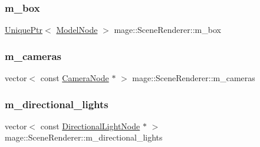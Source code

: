 \hypertarget{classmage_1_1_scene_renderer_a2083891540f5fca8a26ea8a10b7f01cc}{}\label{classmage_1_1_scene_renderer_a2083891540f5fca8a26ea8a10b7f01cc} 
\subsubsection{\texorpdfstring{m\+\_\+box}{m\_box}}
{\footnotesize\ttfamily \hyperlink{namespacemage_a3316d7143a973e37adf1110f2e80ca31}{Unique\+Ptr}$<$ \hyperlink{classmage_1_1_model_node}{Model\+Node} $>$ mage\+::\+Scene\+Renderer\+::m\+\_\+box\hspace{0.3cm}{\ttfamily [private]}}

\hypertarget{classmage_1_1_scene_renderer_ab5cbca432beba0024d5c331ebe94743d}{}\label{classmage_1_1_scene_renderer_ab5cbca432beba0024d5c331ebe94743d} 
\subsubsection{\texorpdfstring{m\+\_\+cameras}{m\_cameras}}
{\footnotesize\ttfamily vector$<$ const \hyperlink{classmage_1_1_camera_node}{Camera\+Node} $\ast$ $>$ mage\+::\+Scene\+Renderer\+::m\+\_\+cameras\hspace{0.3cm}{\ttfamily [private]}}

\hypertarget{classmage_1_1_scene_renderer_a54f958f2edce821fa41913fb900affe7}{}\label{classmage_1_1_scene_renderer_a54f958f2edce821fa41913fb900affe7} 
\subsubsection{\texorpdfstring{m\+\_\+directional\+\_\+lights}{m\_directional\_lights}}
{\footnotesize\ttfamily vector$<$ const \hyperlink{namespacemage_a7637b5351fc0f66a10badd80ebb35899}{Directional\+Light\+Node} $\ast$ $>$ mage\+::\+Scene\+Renderer\+::m\+\_\+directional\+\_\+lights\hspace{0.3cm}{\ttfamily [private]}}

